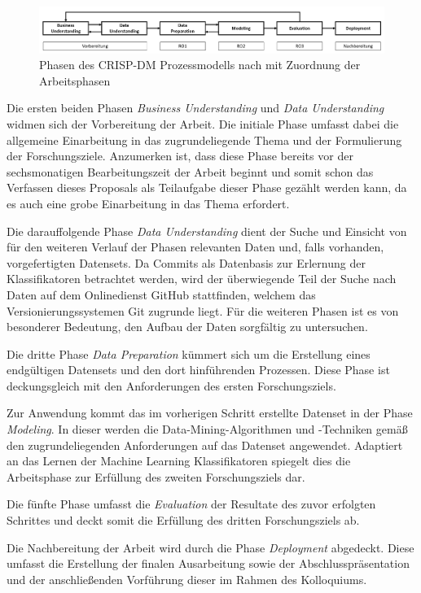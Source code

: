 \begin{figure}[H]
    \centering
    \includegraphics[width=\textwidth]{images/CRISP-DM}
    \caption{Phasen des CRISP-DM Prozessmodells nach \cite{Chapman2000} mit Zuordnung der Arbeitsphasen}\label{fig:crisp}
\end{figure}

Die ersten beiden Phasen \emph{Business Understanding} und \emph{Data Understanding} widmen sich der Vorbereitung der Arbeit. Die initiale Phase umfasst dabei die allgemeine Einarbeitung in das zugrundeliegende Thema und der Formulierung der Forschungsziele. Anzumerken ist, dass diese Phase bereits vor der sechsmonatigen Bearbeitungszeit der Arbeit beginnt und somit schon das Verfassen dieses Proposals als Teilaufgabe dieser Phase gezählt werden kann, da es auch eine grobe Einarbeitung in das Thema erfordert.

Die darauffolgende Phase \emph{Data Understanding} dient der Suche und Einsicht von für den weiteren Verlauf der Phasen relevanten Daten und, falls vorhanden, vorgefertigten Datensets. Da Commits als Datenbasis zur Erlernung der Klassifikatoren betrachtet werden, wird der überwiegende Teil der Suche nach Daten auf dem Onlinedienst GitHub stattfinden, welchem das Versionierungssystemen Git zugrunde liegt. Für die weiteren Phasen ist es von besonderer Bedeutung, den Aufbau der Daten sorgfältig zu untersuchen.

Die dritte Phase \emph{Data Preparation} kümmert sich um die Erstellung eines endgültigen Datensets und den dort hinführenden Prozessen. Diese Phase ist deckungsgleich mit den Anforderungen des ersten Forschungsziels.

Zur Anwendung kommt das im vorherigen Schritt erstellte Datenset in der Phase \emph{Modeling}. In dieser werden die Data-Mining-Algorithmen und -Techniken gemäß den zugrundeliegenden Anforderungen auf das Datenset angewendet. Adaptiert an das Lernen der Machine Learning Klassifikatoren spiegelt dies die Arbeitsphase zur Erfüllung des zweiten Forschungsziels dar. 

Die fünfte Phase umfasst die \emph{Evaluation} der Resultate des zuvor erfolgten Schrittes und deckt somit die Erfüllung des dritten Forschungsziels ab.

Die Nachbereitung der Arbeit wird durch die Phase \emph{Deployment} abgedeckt. Diese umfasst die Erstellung der finalen Ausarbeitung sowie der Abschlusspräsentation und der anschließenden Vorführung dieser im Rahmen des Kolloquiums.

